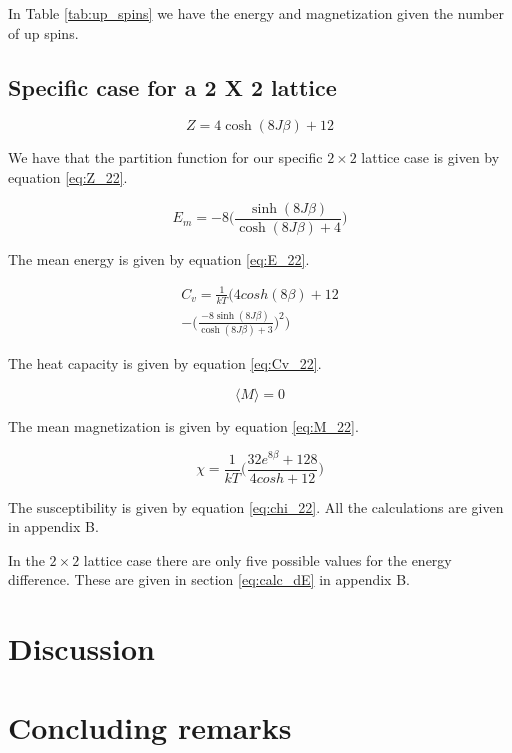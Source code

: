 \documentclass{article}
\begin{document}
\begin{multicols}{2}
In Table \ref{tab:up_spins} we have the energy and magnetization given the number of up spins. 

\subsection*{Specific case for a 2 X 2 lattice}

\begin{equation}
Z=4\cosh{(8J\beta)}+12
\label{eq:Z_22}
\end{equation}

We have that the partition function for our specific $2\times2$ lattice case is given by equation \ref{eq:Z_22}.

\begin{equation}
E_m=-8\bigg(\frac{\sinh{(8J\beta)}}{\cosh{(8J\beta)}+4}\bigg)
\label{eq:E_22}
\end{equation}

The mean energy is given by equation \ref{eq:E_22}.

\begin{equation}
\begin{split}
C_v = \frac{1}{kT} \bigg({4cosh(8\beta)+12}\\
-\bigg(\frac{-8\sinh{(8J\beta)}}{\cosh{(8J\beta)}+3}\bigg)^2\bigg)
\end{split}
\label{eq:Cv_22}
\end{equation}

The heat capacity is given by equation \ref{eq:Cv_22}.

\begin{equation}
\langle M \rangle=0
\label{eq:M_22}
\end{equation}

The mean magnetization is given by equation \ref{eq:M_22}.

\begin{equation}
\chi = \frac{1}{kT} \bigg(\frac{32e^{8\beta}+128}{4cosh+12}\bigg)
\label{eq:chi_22}
\end{equation}

The susceptibility is given by equation \ref{eq:chi_22}. All the calculations are given in appendix B.

In the $2\times2$ lattice case there are only five possible values for the energy difference. These are given in section \ref{eq:calc_dE} in appendix B.

\section{Discussion}

\section{Concluding remarks}

\end{multicols}
\end{document}
